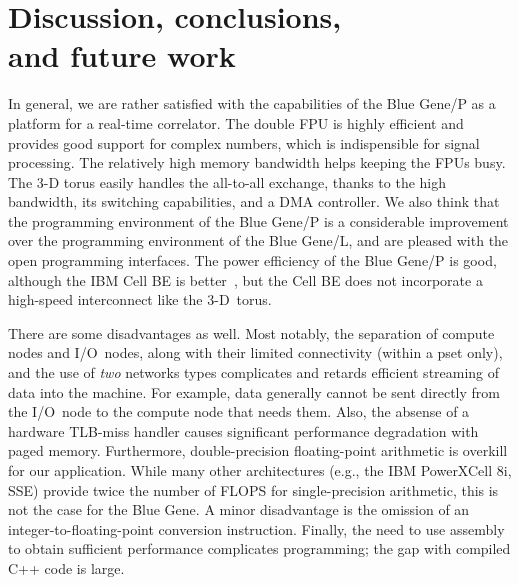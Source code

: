 \documentclass{sig-alternate}
\begin{document}



\section{Discussion, conclusions, \\ and future work}
\label{sec:conclusions}

In general, we are rather satisfied with the capabilities of the Blue Gene/P
as a platform for a real-time correlator.
The double FPU is highly efficient and provides good support for complex
numbers, which is indispensible for signal processing.
The relatively high memory bandwidth helps keeping the FPUs busy.
The 3-D torus easily handles the all-to-all exchange, thanks to the high
bandwidth, its switching capabilities, and a DMA controller.
We also think that the programming environment of the Blue Gene/P is a
considerable improvement over the programming environment of the Blue Gene/L,
and are pleased with the open programming interfaces.
The power efficiency of the Blue Gene/P is good, although the IBM Cell BE is
better~\cite{Nieuwpoort:09}, but the Cell BE does not incorporate a high-speed
interconnect like the 3-D~torus.

There are some disadvantages as well.
Most notably, the separation of compute nodes and I/O~nodes, along with their
limited connectivity (within a pset only), and the use of \emph{two\/}
networks types complicates and retards efficient streaming of data into the
machine.
For example, data generally cannot be sent directly from the I/O~node to the
compute node that needs them.
Also, the absense of a hardware TLB-miss handler causes significant
performance degradation with paged memory.
Furthermore, double-precision floating-point arithmetic is overkill for our
application.
While many other architectures (e.g., the IBM PowerXCell 8i, SSE) provide twice
the number of FLOPS for single-precision arithmetic, this is not the case for
the Blue Gene.
A minor disadvantage is the omission of an integer-to-floating-point conversion
instruction.
Finally, the need to use assembly to obtain sufficient performance complicates
programming; the gap with compiled C++ code is large.
\end{document}
